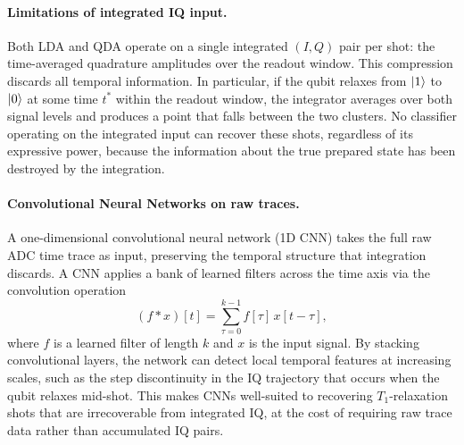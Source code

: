 \paragraph{Limitations of integrated IQ input.}
Both LDA and QDA operate on a single integrated $(I, Q)$ pair per shot: the
time-averaged quadrature amplitudes over the readout window.  This compression
discards all temporal information.  In particular, if the qubit relaxes from
$\ket{1}$ to $\ket{0}$ at some time $t^*$ within the readout window, the
integrator averages over both signal levels and produces a point that falls between
the two clusters.  No classifier operating on the integrated input can recover
these shots, regardless of its expressive power, because the information about the
true prepared state has been destroyed by the integration.

\paragraph{Convolutional Neural Networks on raw traces.}
A one-dimensional convolutional neural network (1D CNN) takes the full raw ADC
time trace as input, preserving the temporal structure that integration discards.
A CNN applies a bank of learned filters across the time axis via the convolution
operation
\begin{equation}
  (f * x)[t] = \sum_{\tau=0}^{k-1} f[\tau]\, x[t - \tau],
\label{eq:conv}
\end{equation}
where $f$ is a learned filter of length $k$ and $x$ is the input signal.  By
stacking convolutional layers, the network can detect local temporal features at
increasing scales, such as the step discontinuity in the IQ trajectory that occurs
when the qubit relaxes mid-shot.  This makes CNNs well-suited to recovering
$T_1$-relaxation shots that are irrecoverable from integrated IQ, at the cost of
requiring raw trace data rather than accumulated IQ pairs.
